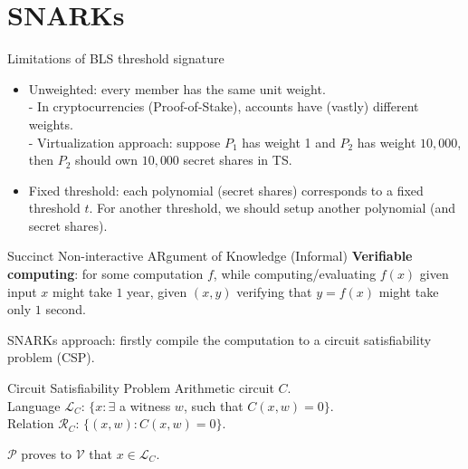 \documentclass[10pt]{beamer}
\begin{document}
\section{SNARKs}
\begin{frame}{Limitations of BLS threshold signature}
\begin{itemize}
    \item Unweighted: every member has the same unit weight. \\
        - In cryptocurrencies (Proof-of-Stake), accounts have (vastly) different weights. \\
        - Virtualization approach: suppose $P_1$ has weight 1 and $P_2$ has weight $10,000$, then $P_2$ should own $10,000$ secret shares in TS. \pause 
    \item Fixed threshold: each polynomial (secret shares) corresponds to a fixed threshold $t$. For another threshold, we should setup another polynomial (and secret shares). 
\end{itemize}
\end{frame}

\begin{frame}{Succinct Non-interactive ARgument of Knowledge (Informal)}
\textbf{Verifiable computing}: for some computation $f$, while computing/evaluating $f(x)$ given input $x$ might take $1$ year, given $(x, y)$ verifying that $y=f(x)$ might take only $1$ second. 

SNARKs approach: firstly compile the computation to a circuit satisfiability problem (CSP). 

\begin{block}{Circuit Satisfiability Problem}
Arithmetic circuit $C$. \\
Language $\mathcal{L}_{C}$: $\{ x: \exists$ a witness $w$, such that $C(x, w) = 0\}$.  \\
Relation $\mathcal{R}_C$: $\{(x, w): C(x, w)=0\}$. 
\end{block}

$\mathcal{P}$ proves to $\mathcal{V}$ that $x\in \mathcal{L}_C$. \\

    
\end{frame}
\end{document}
